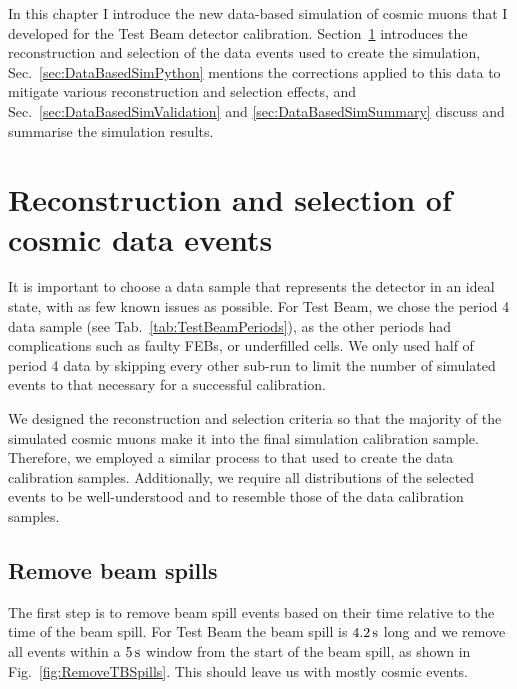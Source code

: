 In this chapter I introduce the new data-based simulation of cosmic muons that I developed for the Test Beam detector calibration. Section~\ref{sec:CosmicGenAna} introduces the reconstruction and selection of the data events used to create the simulation, Sec.~\ref{sec:DataBasedSimPython} mentions the corrections applied to this data to mitigate various reconstruction and selection effects, and Sec.~\ref{sec:DataBasedSimValidation} and \ref{sec:DataBasedSimSummary} discuss and summarise the simulation results.

\section{Reconstruction and selection of cosmic data events}\label{sec:CosmicGenAna}
It is important to choose a data sample that represents the detector in an ideal state, with as few known issues as possible. For Test Beam, we chose the period 4 data sample (see Tab.~\ref{tab:TestBeamPeriods}), as the other periods had complications such as faulty \glspl{FEB}, or underfilled cells. We only used half of period 4 data by skipping every other sub-run to limit the number of simulated events to that necessary for a successful calibration.


We designed the reconstruction and selection criteria so that the majority of the simulated cosmic muons make it into the final simulation calibration sample. Therefore, we employed a similar process to that used to create the data calibration samples. Additionally, we require all distributions of the selected events to be well-understood and to resemble those of the data calibration samples.

\subsection*{Remove beam spills}
The first step is to remove beam spill events based on their time relative to the time of the beam spill. For Test Beam the beam spill is $\unit[4.2]{s}$ long and we remove all events within a $\unit[5]{s}$ window from the start of the beam spill, as shown in Fig.~\ref{fig:RemoveTBSpills}. This should leave us with mostly cosmic events.

